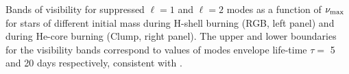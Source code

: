 \label{fig:visibility} Bands of visibility for suppressed $\ell=1$ and $\ell=2$ modes as a function of $\nu_{\rm max}$ for stars of different initial mass during H-shell burning (RGB, left panel) and during He-core burning (Clump, right panel). The upper and lower boundaries for the visibility bands correspond to values of modes envelope life-time $\tau=$ 5 and 20 days respectively, consistent with \citet{Dupret_2009,Corsaro_2015}.

  
  